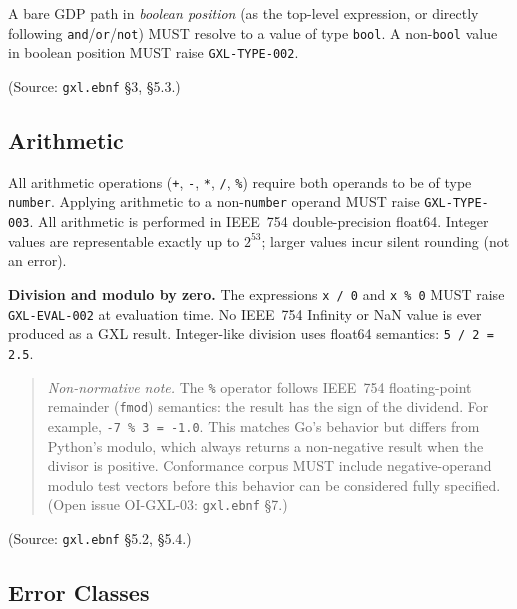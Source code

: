 A bare GDP path in \emph{boolean position} (as the top-level expression,
or directly following \texttt{and}/\texttt{or}/\texttt{not}) MUST resolve
to a value of type \texttt{bool}.
A non-\texttt{bool} value in boolean position MUST raise
\texttt{GXL-TYPE-002}.

(Source: \texttt{gxl.ebnf} \S3, \S5.3.)

\subsection{Arithmetic}
\label{sec:gxl:semantics:arithmetic}

All arithmetic operations (\texttt{+}, \texttt{-}, \texttt{*},
\texttt{/}, \texttt{\%}) require both operands to be of type \texttt{number}.
Applying arithmetic to a non-\texttt{number} operand MUST raise
\texttt{GXL-TYPE-003}.
All arithmetic is performed in IEEE~754 double-precision float64.
Integer values are representable exactly up to $2^{53}$;
larger values incur silent rounding (not an error).

\noindent\textbf{Division and modulo by zero.}
The expressions \texttt{x / 0} and \texttt{x \% 0} MUST raise
\texttt{GXL-EVAL-002} at evaluation time.
No IEEE~754 Infinity or NaN value is ever produced as a GXL result.
Integer-like division uses float64 semantics: \texttt{5 / 2 = 2.5}.

\begin{quote}
\noindent\textit{Non-normative note.}
The \texttt{\%} operator follows IEEE~754 floating-point remainder
(\texttt{fmod}) semantics: the result has the sign of the dividend.
For example, \texttt{-7 \% 3 = -1.0}.
This matches Go's behavior but differs from Python's modulo,
which always returns a non-negative result when the divisor is positive.
Conformance corpus MUST include negative-operand modulo test vectors
before this behavior can be considered fully specified.
(Open issue OI-GXL-03: \texttt{gxl.ebnf} \S7.)
\end{quote}

(Source: \texttt{gxl.ebnf} \S5.2, \S5.4.)

\subsection{Error Classes}
\label{sec:gxl:errors}

